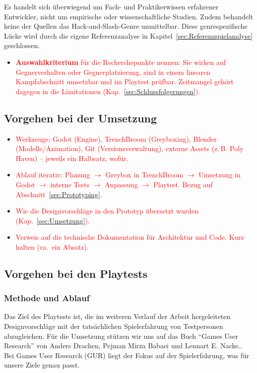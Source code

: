 \documentclass[../Main.tex]{subfiles}
\begin{document}
Es handelt sich überwiegend um Fach- und Praktikerwissen erfahrener Entwickler, nicht um empirische oder wissenschaftliche Studien. Zudem behandelt keine der Quellen das Hack-and-Slash-Genre unmittelbar. Diese genrespezifische Lücke wird durch die eigene Referenzanalyse in Kapitel~\ref{sec:Referenzspielanalyse} geschlossen.

\begin{itemize}[leftmargin=1.5cm]
    \item \textcolor{red}{\textbf{Auswahlkriterium} für die Recherchepunkte nennen: Sie wirken auf Gegnerverhalten oder Gegnerplatzierung, sind in einem linearen Kampfabschnitt umsetzbar und im Playtest prüfbar. Zeitmangel gehört dagegen in die Limitationen (Kap.~\ref{sec:Schlussfolgerungen}).}
\end{itemize}

\subsection{Vorgehen bei der Umsetzung} \label{sec:VorgehenUmsetzung}

\begin{itemize}[leftmargin=1.5cm]
    \item \textcolor{red}{Werkzeuge: Godot (Engine), TrenchBroom (Greyboxing), Blender (Modelle/Animation), Git (Versionsverwaltung), externe Assets (z.\,B. Poly Haven) -- jeweils ein Halbsatz, wofür.}
    \item \textcolor{red}{Ablauf iterativ: Planung $\rightarrow$ Greybox in TrenchBroom $\rightarrow$ Umsetzung in Godot $\rightarrow$ interne Tests $\rightarrow$ Anpassung $\rightarrow$ Playtest. Bezug auf Abschnitt~\ref{sec:Prototyping}.}
    \item \textcolor{red}{Wie die Designvorschläge in den Prototyp übersetzt wurden (Kap.~\ref{sec:Umsetzung}).}
    \item \textcolor{red}{Verweis auf die technische Dokumentation für Architektur und Code. Kurz halten (ca.\ ein Absatz).}
\end{itemize}

\subsection{Vorgehen bei den Playtests} \label{sec:VorgehenPlaytest}

\subsubsection{Methode und Ablauf} \label{sec:MethodePlaytest}
Das Ziel des Playtests ist, die im weiteren Verlauf der Arbeit hergeleiteten Designvorschläge mit der tatsächlichen Spielerfahrung von Testpersonen abzugleichen. Für die Umsetzung stützen wir uns auf das Buch \enquote{Games User Research} von Anders Drachen, Pejman Mirza Babaei und Lennart E. Nacke.\autocite{drachen2018gamesuserresearch}. Bei Games User Research (GUR) liegt der Fokus auf der Spielerfahrung, was für unsere Ziele genau passt.
\end{document}
